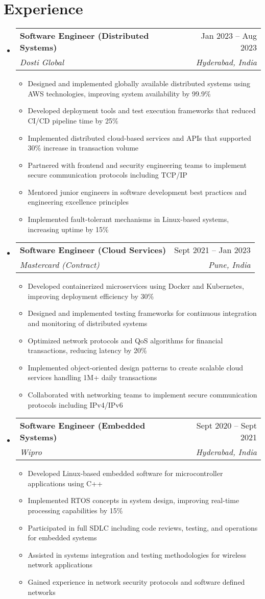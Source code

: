 \documentclass{article}
\makeatletter
\newcommand{\resumeItem}[1]{
  \item\small{
    {#1 \vspace{-2pt}}
  }
}
\newcommand{\resumeSubheading}[4]{
  \vspace{-2pt}\item
    \begin{tabular*}{0.97\textwidth}[t]{l@{\extracolsep{\fill}}r}
      \textbf{#1} & #2 \\
      \textit{\small#3} & \textit{\small #4} \\
    \end{tabular*}\vspace{-7pt}
}
\newcommand{\resumeSubHeadingListStart}{\begin{itemize}[leftmargin=0.15in, label={}]}
\newcommand{\resumeSubHeadingListEnd}{\end{itemize}}
\newcommand{\resumeItemListStart}{\begin{itemize}}
\newcommand{\resumeItemListEnd}{\end{itemize}\vspace{-5pt}}
\makeatother
\begin{document}
\section{Experience}
\resumeSubHeadingListStart
\resumeSubheading
{Software Engineer (Distributed Systems)}{Jan 2023 – Aug 2023}
{Dosti Global}{Hyderabad, India}
\resumeItemListStart
\resumeItem{Designed and implemented globally available distributed systems using AWS technologies, improving system availability by 99.9\%}
\resumeItem{Developed deployment tools and test execution frameworks that reduced CI/CD pipeline time by 25\%}
\resumeItem{Implemented distributed cloud-based services and APIs that supported 30\% increase in transaction volume}
\resumeItem{Partnered with frontend and security engineering teams to implement secure communication protocols including TCP/IP}
\resumeItem{Mentored junior engineers in software development best practices and engineering excellence principles}
\resumeItem{Implemented fault-tolerant mechanisms in Linux-based systems, increasing uptime by 15\%}
\resumeItemListEnd
\resumeSubheading
{Software Engineer (Cloud Services)}{Sept 2021 – Jan 2023}
{Mastercard (Contract)}{Pune, India}
\resumeItemListStart
\resumeItem{Developed containerized microservices using Docker and Kubernetes, improving deployment efficiency by 30\%}
\resumeItem{Designed and implemented testing frameworks for continuous integration and monitoring of distributed systems}
\resumeItem{Optimized network protocols and QoS algorithms for financial transactions, reducing latency by 20\%}
\resumeItem{Implemented object-oriented design patterns to create scalable cloud services handling 1M+ daily transactions}
\resumeItem{Collaborated with networking teams to implement secure communication protocols including IPv4/IPv6}
\resumeItemListEnd
\resumeSubheading
{Software Engineer (Embedded Systems)}{Sept 2020 – Sept 2021}
{Wipro}{Hyderabad, India}
\resumeItemListStart
\resumeItem{Developed Linux-based embedded software for microcontroller applications using C++}
\resumeItem{Implemented RTOS concepts in system design, improving real-time processing capabilities by 15\%}
\resumeItem{Participated in full SDLC including code reviews, testing, and operations for embedded systems}
\resumeItem{Assisted in systems integration and testing methodologies for wireless network applications}
\resumeItem{Gained experience in network security protocols and software defined networks}
\resumeItemListEnd
\resumeSubHeadingListEnd
\end{document}
